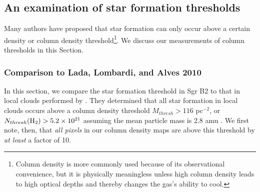\documentclass[twocolumn]{aastex61}
\begin{document}




% 

\subsection{An examination of star formation thresholds}
Many authors \citep[e.g.,][]{Lada2010a} have proposed that star formation can
only occur above a certain density or column density threshold\footnote{Column
density is more commonly used because of its observational convenience, but it
is physically meaningless unless high column density leads to high optical
depths and thereby changes the gas's ability to cool.}. 
We discuss our measurements of column thresholds in this Section.



\subsubsection{Comparison to Lada, Lombardi, and Alves 2010}
In this section, we compare the star formation threshold in Sgr B2 to that in
local clouds performed by \citet{Lada2010a}.  They determined that all star
formation in local clouds occurs above a column density threshold $M_{thresh} >
116$ \msun pc$^{-2}$, or $N_{thresh}(\textrm{H}_{2}) > 5.2\times10^{21}$ \persc assuming the
mean particle mass is 2.8 amu \citep{Kauffmann2008a}.  We first note, then,
that \emph{all pixels} in our column density maps are above this threshold
by \emph{at least} a factor of 10.
\end{document}
